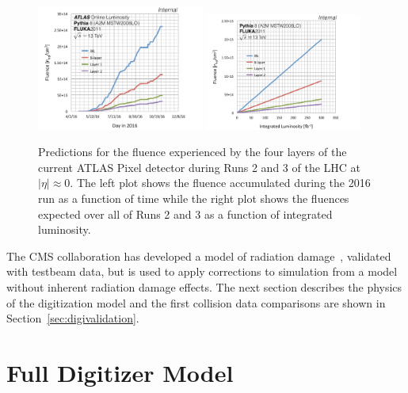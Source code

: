 \begin{figure}[htpb!]
\centering
\includegraphics[width=0.49\textwidth]{Fluence_2016}
\includegraphics[width=0.46\textwidth]{Fluence_Run23.pdf}
\caption{Predictions for the fluence experienced by the four layers of the current ATLAS Pixel detector during Runs 2 and 3 of the LHC at $|\eta|\approx 0$.  The left plot shows the fluence accumulated during the 2016 run as a function of time while the right plot shows the fluences expected over all of Runs 2 and 3 as a function of integrated luminosity.}
\label{fig:fluenceoverview}
\end{figure}
  



The CMS collaboration has developed a model of radiation damage~\cite{Contardo:2020886,Swartz2002,Chiochia:2004qh,Swartz:2005vp}, validated with testbeam data, but is used to apply corrections to simulation from a model without inherent radiation damage effects.  The next section describes the physics of the digitization model and the first collision data comparisons are shown in Section~\ref{sec:digivalidation}.


\section{Full Digitizer Model}
\label{sec:fullmodel}

